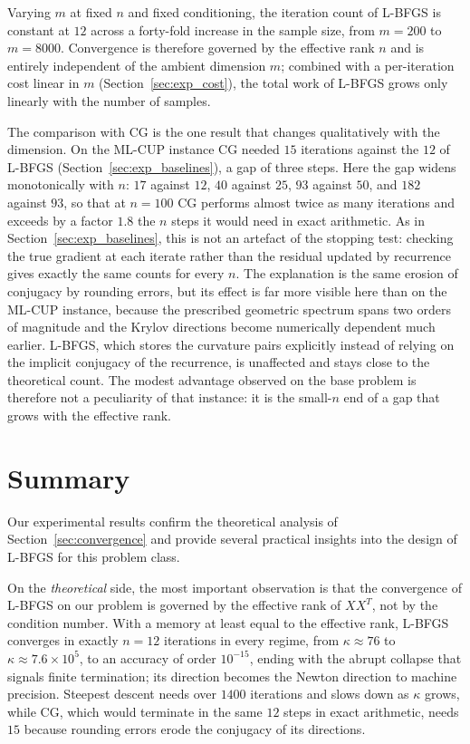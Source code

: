 \noindent Varying $m$ at fixed $n$ and fixed conditioning, the iteration count of
L-BFGS is constant at $12$ across a forty-fold increase in the sample size,
from $m = 200$ to $m = 8000$. Convergence is therefore governed by the
effective rank $n$ and is entirely independent of the ambient dimension $m$;
combined with a per-iteration cost linear in $m$
(Section~\ref{sec:exp_cost}), the total work of L-BFGS grows only linearly
with the number of samples.

\noindent The comparison with CG is the one result that changes qualitatively
with the dimension. On the ML-CUP instance CG needed $15$ iterations against
the $12$ of L-BFGS (Section~\ref{sec:exp_baselines}), a gap of three steps.
Here the gap widens monotonically with $n$: $17$ against $12$, $40$ against
$25$, $93$ against $50$, and $182$ against $93$, so that at $n = 100$ CG
performs almost twice as many iterations and exceeds by a factor $1.8$ the
$n$ steps it would need in exact arithmetic. As in Section~\ref{sec:exp_baselines}, this is not an artefact of the
stopping test: checking the true gradient at each iterate rather than the
residual updated by recurrence gives exactly the same counts for every $n$. The
explanation is the same erosion of conjugacy by rounding errors, but its
effect is far more visible here than on the ML-CUP instance, because the
prescribed geometric spectrum spans two orders of magnitude and the Krylov
directions become numerically dependent much earlier. L-BFGS, which stores
the curvature pairs explicitly instead of relying on the implicit conjugacy
of the recurrence, is unaffected and stays close to the theoretical count. The
modest advantage observed on the base problem is therefore not a peculiarity
of that instance: it is the small-$n$ end of a gap that grows with the
effective rank.


\section{Summary}
\label{sec:exp_summary}

\noindent Our experimental results confirm the theoretical analysis of
Section~\ref{sec:convergence} and provide several practical insights into
the design of L-BFGS for this problem class.

\noindent On the \emph{theoretical} side, the most important observation is that
the convergence of L-BFGS on our problem is governed by the effective rank of
$XX^T$, not by the condition number. With a memory at least equal to the
effective rank, L-BFGS converges in exactly $n = 12$ iterations in every
regime, from $\kappa \approx 76$ to $\kappa \approx 7.6 \times 10^5$, to an
accuracy of order $10^{-15}$, ending with the abrupt collapse that signals
finite termination; its direction becomes the Newton direction to machine
precision. Steepest descent needs over $1400$ iterations and slows down as
$\kappa$ grows, while CG, which would terminate in the same $12$ steps in
exact arithmetic, needs $15$ because rounding errors erode the conjugacy of
its directions.

